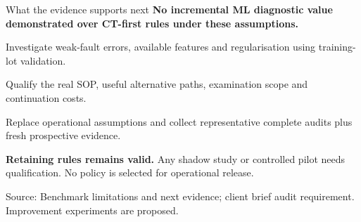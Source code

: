 \documentclass[aspectratio=169,11pt]{beamer}
\newcommand{\lead}[1]{{\large\bfseries #1}\par\medskip}
\newcommand{\source}[1]{\vfill{\fontsize{6.6}{8}\selectfont\color{Muted}Source: #1\par}}
\newcommand{\smalltext}[1]{{\fontsize{9}{11.4}\selectfont #1\par}}
\begin{document}
\begin{frame}[t]{What the evidence supports next}
  \lead{No incremental ML diagnostic value demonstrated\newline
    over CT-first rules under these assumptions.}
  \vspace{1mm}
  \begin{description}
    \setlength{\itemsep}{2.4mm}
    \item[Prediction] Investigate weak-fault errors, available features and
      regularisation using training-lot validation.
    \item[Decision] Qualify the real SOP, useful alternative paths,
      examination scope and continuation costs.
    \item[Evidence] Replace operational assumptions and collect representative
      complete audits plus fresh prospective evidence.
  \end{description}
  \vspace{3mm}
  \smalltext{\textbf{Retaining rules remains valid.} Any shadow study or controlled pilot
    needs qualification. No policy is selected for operational release.}
  \source{Benchmark limitations and next evidence; client brief audit requirement. Improvement experiments are proposed.}
  \note{\SlideEightNotes}
\end{frame}
\end{document}
